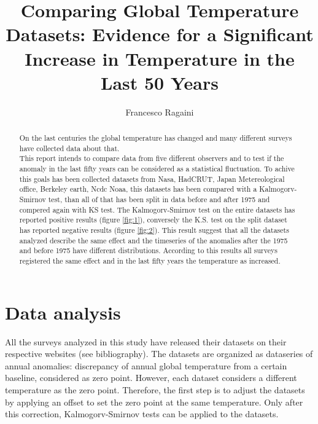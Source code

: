 \documentclass[a4paper,11pt,rmp,superscriptaddress]{revtex4}
\begin{document}
\author{Francesco Ragaini}

\title{Comparing Global Temperature Datasets: Evidence for a Significant Increase in Temperature in the Last 50 Years}
\begin{abstract}

On the last centuries the global temperature has changed and many different surveys have collected data about that.\\
This report intends to compare data from five different observers and to test if the anomaly in the last fifty years 
can be considered as a statistical fluctuation.
To achive this goals has been collected datasets from Nasa, HadCRUT, Japan Metereological office, Berkeley earth, Ncdc Noaa, 
this datasets has been compared with a Kalmogorv-Smirnov test, than all of that has been split in data before and after 1975 and compered 
again with KS test.
The Kalmogorv-Smirnov test on the entire datasets has reported positive results (figure \ref*{fig:1}), conversely the K.S. test 
on the split dataset has reported negative results (figure \ref*{fig:2}).
This result suggest that all the datasets analyzed describe the same effect and the timeseries of the anomalies after the 1975 and 
before 1975 have different distributions. According to this results all surveys registered the same effect
and in the last fifty years the temperature as increased.
\end{abstract}

\maketitle
\section*{Data analysis}
All the surveys analyzed in this study have released their datasets on their respective websites (see bibliography). 
The datasets are organized as dataseries of annual anomalies: discrepancy of annual global temperature from a certain baseline, 
considered as zero point.
However, each dataset considers a different temperature as the zero point. Therefore, 
the first step is to adjust the datasets by applying an offset to set the zero point at the same temperature. 
Only after this correction, Kalmogorv-Smirnov tests can be applied to the datasets.
\end{document}
